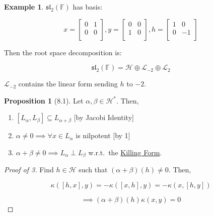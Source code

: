 \documentclass{article}
\theoremstyle{definition}
\newtheorem*{example}{Example}
\newtheorem{proposition}[theorem]{Proposition}
\begin{document}
\begin{example}
    \(\mathfrak{sl}_2(\mathbb{F})\) has basis:

    \[
        x = \begin{bmatrix}
            0 &  1 \\
            0 &  0 \\
        \end{bmatrix}, y = \begin{bmatrix}
            0 &  0 \\
            1 &  0 \\
        \end{bmatrix}, h = \begin{bmatrix}
            1 &  0 \\
            0 &  -1 \\
        \end{bmatrix}
    \]

    Then the root space decomposition is:

    \[
        \mathfrak{sl}_2(\mathbb{F}) = \mathcal{H} \oplus \mathcal{L}_{-2} \oplus \mathcal{L}_{2}
    \]

    \(\mathcal{L}_{-2}\) contains the linear form sending \(h\) to \(-2\). 

\end{example}

\begin{proposition}
    [8.1] Let \(\alpha , \beta \in \mathcal{H} ^{\ast}\). Then,

    \begin{enumerate}[label=\arabic*)]
        \item \([L_\alpha , L_\beta] \subseteq L_{\alpha + \beta}\) [by Jacobi Identity]
        \item \(\alpha \neq 0 \implies \forall x\in L_\alpha\) is nilpotent [by 1]
        \item \(\alpha + \beta \neq 0 \implies L_\alpha \perp L_\beta\) w.r.t.\ the \underline{Killing Form}. 
    \end{enumerate} 
\end{proposition}

\begin{proof}
    [Proof of 3] Find \(h\in \mathcal{H}\) such that \((\alpha + \beta)(h) \neq 0\). Then,

    \[
        \kappa([h,x],y) = - \kappa([x,h],y) = - \kappa(x,[h,y])
    \]

    \[
        \implies (\alpha+\beta)(h)\kappa(x,y) = 0
    \]
\end{proof}
\end{document}
